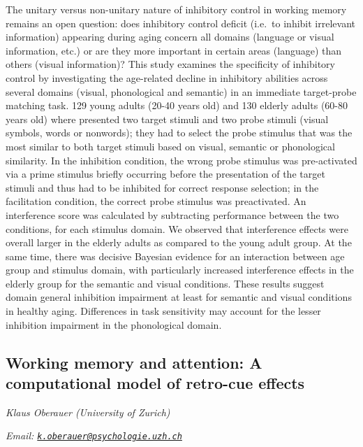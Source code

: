 \documentclass[
  12pt,
]{book}
\begin{document}
The unitary versus non-unitary nature of inhibitory control in working memory remains an open question: does inhibitory control deficit (i.e.~to inhibit irrelevant information) appearing during aging concern all domains (language or visual information, etc.) or are they more important in certain areas (language) than others (visual information)? This study examines the specificity of inhibitory control by investigating the age-related decline in inhibitory abilities across several domains (visual, phonological and semantic) in an immediate target-probe matching task. 129 young adults (20-40 years old) and 130 elderly adults (60-80 years old) where presented two target stimuli and two probe stimuli (visual symbols, words or nonwords); they had to select the probe stimulus that was the most similar to both target stimuli based on visual, semantic or phonological similarity. In the inhibition condition, the wrong probe stimulus was pre-activated via a prime stimulus briefly occurring before the presentation of the target stimuli and thus had to be inhibited for correct response selection; in the facilitation condition, the correct probe stimulus was preactivated. An interference score was calculated by subtracting performance between the two conditions, for each stimulus domain. We observed that interference effects were overall larger in the elderly adults as compared to the young adult group. At the same time, there was decisive Bayesian evidence for an interaction between age group and stimulus domain, with particularly increased interference effects in the elderly group for the semantic and visual conditions. These results suggest domain general inhibition impairment at least for semantic and visual conditions in healthy aging. Differences in task sensitivity may account for the lesser inhibition impairment in the phonological domain.

\hypertarget{working-memory-and-attention-a-computational-model-of-retro-cue-effects}{%
\subsection{Working memory and attention: A computational model of retro-cue effects}\label{working-memory-and-attention-a-computational-model-of-retro-cue-effects}}

\emph{Klaus Oberauer (University of Zurich)}

\emph{Email: \href{mailto:k.oberauer@psychologie.uzh.ch}{\nolinkurl{k.oberauer@psychologie.uzh.ch}}}
\end{document}
